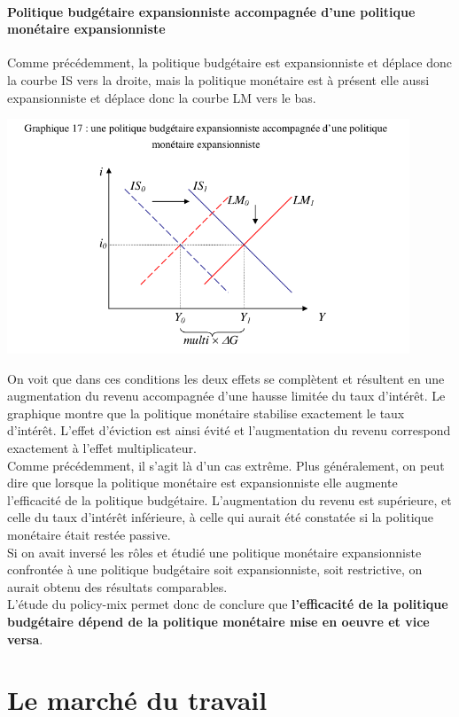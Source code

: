 \documentclass[10pt]{book}
\begin{document}
\subsubsection{Politique budgétaire expansionniste accompagnée d'une politique monétaire expansionniste}
Comme précédemment, la politique budgétaire est expansionniste et déplace donc la courbe IS vers la droite, mais la politique monétaire est à présent elle aussi expansionniste et déplace donc la courbe LM vers le bas.
\begin{center}
  \includegraphics[width=12cm]{graph42.png}
\end{center}
On voit que dans ces conditions les deux effets se complètent et résultent en une augmentation du revenu accompagnée d'une hausse limitée du taux d'intérêt. Le graphique montre que la politique monétaire stabilise exactement le taux d'intérêt. L'effet d'éviction est ainsi évité et l'augmentation du revenu correspond exactement à l'effet multiplicateur. \\
Comme précédemment, il s'agit là d'un cas extrême. Plus généralement, on peut dire que lorsque la politique monétaire est expansionniste elle augmente l'efficacité de la politique budgétaire. L'augmentation du revenu est supérieure, et celle du taux d'intérêt inférieure, à celle qui aurait été constatée si la politique monétaire était restée passive. \\
Si on avait inversé les rôles et étudié une politique monétaire expansionniste confrontée à une politique budgétaire soit expansionniste, soit restrictive, on aurait obtenu des résultats comparables. \\
L'étude du policy-mix permet donc de conclure que \textbf{l'efficacité de la politique budgétaire dépend de la politique monétaire mise en oeuvre et vice versa}.


\chapter{Le marché du travail}
\end{document}
